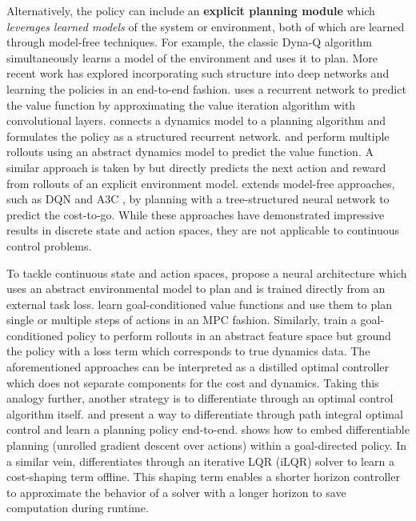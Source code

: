 Alternatively, the policy can include an \textbf{explicit planning module}
which \emph{leverages learned models} of the system or environment,
both of which are learned through model-free techniques.
For example, the classic Dyna-Q algorithm
\citep{sutton1990integrated} simultaneously learns a model of
the environment and uses it to plan.
More recent work has explored incorporating such structure into deep
networks and learning the policies in an end-to-end fashion.
\citet{tamar2016value} uses a recurrent network to predict the value function by
approximating the value iteration algorithm with convolutional layers.
\citet{karkus2017qmdp} connects a dynamics model to a planning
algorithm and formulates the policy as a structured recurrent network.
\citet{silver2016predictron} and \citet{oh2017value} perform multiple rollouts
using an abstract dynamics model to predict the value function.
A similar approach is taken by \citet{weber2017imagination} but directly
predicts the next action and reward from rollouts of an explicit environment model.
\citet{farquhar2017treeqn} extends model-free approaches, such as
DQN \citep{mnih2015human} and A3C \citep{mnih2016asynchronous}, by planning
with a tree-structured neural network to predict the cost-to-go.
While these approaches have demonstrated impressive results in
discrete state and action spaces, they are not applicable to
continuous control problems.

To tackle continuous state and action spaces, \citet{pascanu2017learning}
propose a neural architecture which uses an abstract environmental
model to plan and is trained directly from an external task loss.
\citet{pong2018temporal} learn goal-conditioned value functions and use them
to plan single or multiple steps of actions in an MPC fashion.
Similarly, \citet{pathak2018zero} train a goal-conditioned policy to perform
rollouts in an abstract feature space but ground the policy with a loss term
which corresponds to true dynamics data.
The aforementioned approaches can be interpreted as a distilled optimal controller
which does not separate components for the cost and dynamics.
Taking this analogy further, another strategy is to differentiate through an
optimal control algorithm itself.
\citet{okada2017path} and \citet{pereira2018pinets} present a way
to differentiate through path integral optimal control
\citep{williams2016aggressive,williams2017model}
and learn a planning policy end-to-end.
\citet{srinivas2018universal} shows how to embed
differentiable planning (unrolled gradient descent over actions) within
a goal-directed policy.
In a similar vein, \citet{tamar2017learning} differentiates
through an iterative LQR (iLQR) solver
\citep{li2004ilqr,xie2017ddp,tassa2014control}
to learn a cost-shaping term offline.
This shaping term enables a shorter horizon controller to approximate the
behavior of a solver with a longer horizon to save computation during runtime.

